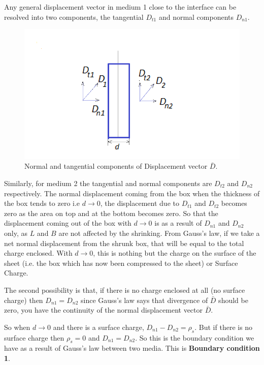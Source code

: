 Any general displacement vector in medium 1 close to the interface can be resolved into two components, the tangential $D_{t1}$ and normal components $D_{n1}$. 
\begin{figure}[h]
\centering
\includegraphics[width=1\linewidth]{graphics/diemedium3}
\caption{Normal and tangential components of Displacement vector $\bar{D}$.}
\end{figure}
Similarly, for medium 2 the tangential and normal components are $D_{t2}$ and $D_{n2}$ respectively. The normal displacement coming from the box when the thickness of the box tends to zero i.e $d \longrightarrow 0$, the displacement due to $D_{t1}$ and $D_{t2}$ becomes zero as the area on top and at the bottom becomes zero. So that the displacement coming out of the box with $d \longrightarrow 0$ is as a result of $D_{n1}$ and $D_{n2}$ only, as $L$ and $B$ are not affected by the shrinking. From Gauss's law, if we take a net normal displacement from the shrunk box, that will be equal to the total charge enclosed. With $d \longrightarrow 0$, this is nothing but the charge on the surface of the sheet (i.e. the box which has now been compressed to the sheet) or Surface Charge.

The second possibility is that, if there is no charge enclosed at all (no surface charge) then $D_{n1}= D_{n2}$ since Gauss's law says that divergence of $\bar{D}$ should be zero, you have the continuity of the normal displacement vector $\bar{D}$.

So when 
$d \longrightarrow 0$ and there is a surface charge, $D_{n1}- D_{n2} = \rho_s$. But if there is no surface charge then $\rho_s = 0$ and $D_{n1}= D_{n2}$. So this is the boundary condition we have as a result of Gauss's law between two media. This is \textbf{Boundary condition 1}.


